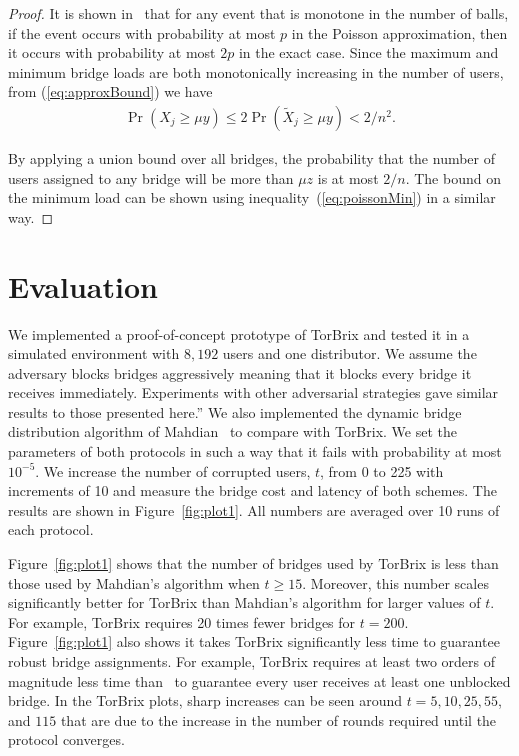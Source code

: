 \documentclass[letterpaper,twocolumn,10pt]{article}
\newcommand{\sfsize}{\fontsize{0.73\baselineskip}{0.73\baselineskip}\selectfont}
\newcommand{\sans}[1]{\textsf{\sfsize \mbox{#1}}}
\newcommand{\brix}{\sans{TorBrix}\xspace}
\begin{document}
\begin{proof}
	It is shown in~\cite[Corollary 5.11]{Michael2005} that for any event that is monotone in the number of balls, if the event occurs with probability at most $p$ in the Poisson approximation, then it occurs with probability at most $2p$ in the exact case. Since the maximum and minimum bridge loads are both monotonically increasing in the number of users, from (\ref{eq:approxBound}) we have
	\begin{align*}
	\Pr(X_j \geq \mu y) \leq 2\Pr(\tilde{X}_j \geq \mu y) < 2/n^2.
	\end{align*}
	
	By applying a union bound over all bridges, the probability that the number of users assigned to any bridge will be more than $\mu z$ is at most $2/n$. The bound on the minimum load can be shown using inequality~(\ref{eq:poissonMin}) in a similar way.
\end{proof}


\section{Evaluation} \label{sec:simulations}

We implemented a proof-of-concept prototype of \brix and tested it in a simulated environment with $8,192$ users and one distributor. We assume the adversary blocks bridges aggressively meaning that it blocks every bridge it receives immediately. Experiments with other adversarial strategies gave similar results to those presented here.”%
We also implemented the dynamic bridge distribution algorithm of Mahdian~\cite{Mahdian:2010} to compare with \brix. We set the parameters of both protocols in such a way that it fails with probability at most $10^{-5}$. We increase the number of corrupted users, $t$, from 0 to 225 with increments of 10 and measure the bridge cost and latency of both schemes. The results are shown in Figure~\ref{fig:plot1}. All numbers are averaged over 10 runs of each protocol.

Figure~\ref{fig:plot1} shows that the number of bridges used by \brix is less than those used by Mahdian's algorithm when ${t\geq15}$. Moreover, this number scales significantly better for \brix than Mahdian's algorithm for larger values of $t$. For example, \brix requires 20 times fewer bridges for ${t=200}$. Figure~\ref{fig:plot1} also shows it takes \brix significantly less time to guarantee robust bridge assignments. For example, \brix requires at least two orders of magnitude less time than~\cite{Mahdian:2010} to guarantee every user receives at least one unblocked bridge. In the \brix plots, sharp increases can be seen around $t=5, 10, 25, 55$, and $115$ that are due to the increase in the number of rounds required until the protocol converges.
\end{document}
